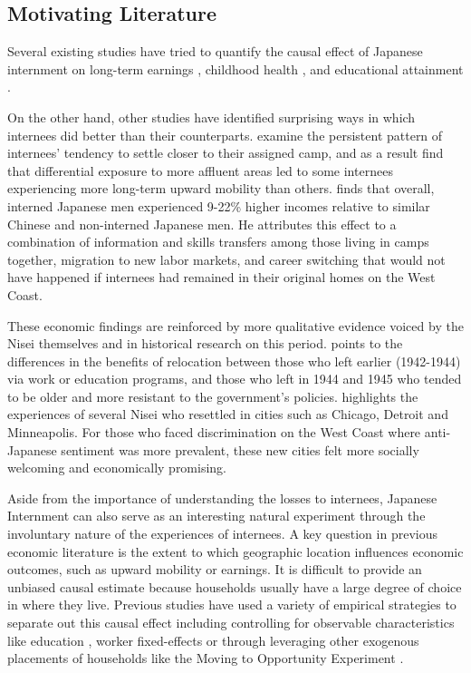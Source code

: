 \subsection{Motivating Literature}\label{motivation}

Several existing studies have tried to quantify the causal effect 
of Japanese internment on long-term earnings
\citep{chinLongRunLaborMarket2005}, 
childhood health
\citep{saavedraEarlyChildhoodConditions2013, 
grossmanIntergenerationalHealthEffects2025},
and educational attainment 
\citep{saavedraSchoolQualityEducational2015}. 

On the other hand, other studies have identified surprising ways 
in which internees did better than their counterparts.
\cite{shoagCausalEffectPlace2016} examine the persistent pattern of 
internees' tendency to settle closer to their assigned camp,
and as a result find that differential exposure to more affluent areas 
led to some internees experiencing more long-term upward mobility than others.
\cite{arellano-boverDisplacementDiversityMobility2022} finds that overall, 
interned Japanese men experienced 9-22\% higher incomes 
relative to similar Chinese and non-interned Japanese men.
He attributes this effect to a combination of information and skills transfers 
among those living in camps together, 
migration to new labor markets, and career switching
that would not have happened if internees had remained in their original homes 
on the West Coast.

These economic findings are reinforced by more qualitative evidence
voiced by the Nisei themselves
and in historical research on this period.
\cite{taylorLeavingConcentrationCamps1991}
points to the differences in the benefits of relocation between
those who left earlier (1942-1944) via work or education programs,
and those who left in 1944 and 1945 who tended to be older
and more resistant to the government's policies.
\cite{austinEastwardPioneersJapanese2007} 
highlights the experiences of several Nisei who resettled in cities such as
Chicago, Detroit and Minneapolis.
For those who faced discrimination on the West Coast
where anti-Japanese sentiment was more prevalent,
these new cities felt more socially welcoming
and economically promising.

Aside from the importance of understanding the losses to internees, Japanese
Internment can also serve as an interesting natural experiment through the
involuntary nature of the experiences of internees. 
A key question in previous economic literature is the extent to which 
geographic location influences economic outcomes, such as upward mobility or earnings.
It is difficult to provide an unbiased causal estimate because households usually
have a large degree of choice in where they live. Previous studies have used a
variety of empirical strategies to separate out this causal effect including
controlling for observable characteristics like education
\citep{glaeserCitiesSkills2001}, worker fixed-effects or
through leveraging other exogenous placements of households like the Moving to
Opportunity Experiment 
\citep{chettyEffectsExposureBetter2016}. 

